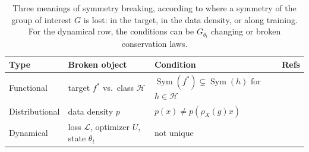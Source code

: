 \documentclass[mathematics,review,submit,moreauthors]{Definitions/mdpi}
\begin{document}
\begin{table}[ht]
    \centering
    \begin{tabularx}{\textwidth}{|l|l|>{\raggedright\arraybackslash}X|>{\raggedright\arraybackslash}X|}
        \hline
        \textbf{Type} & \textbf{Broken object} & \textbf{Condition} & \textbf{Refs} \\
        \hline
        Functional & target $f^*$ vs.\ class $\mathcal{H}$ & $\operatorname{Sym}(f^*)\subsetneq\operatorname{Sym}(h)$ for $h\in \mathcal{H}$ & \citep{wang2023a,zhang2019p3icml,smidt2021prr,lawrence2024,goel2025} \\
        \hline
        Distributional & data density $p$ & $p(x)\neq p(\rho_X(g)x)$ & \citep{lawrence2026,rygiel2026,chen2020,urbano2026} \\
        \hline
        Dynamical & loss $\mathcal{L}$, optimizer $U$, state $\theta_t$ & not unique & \citep{kunin2020,tanaka2021,ziyin2025,arjevani2023} \\
        \hline
    \end{tabularx}
    \caption{Three meanings of symmetry breaking, according to where a symmetry of the group of interest $G$ is lost: in the target, in the data density, or along training.
    For the dynamical row, the conditions can be $G_{\theta_t}$ changing or broken conservation laws.}
    \label{table:symmetry-breaking}
\end{table}
\end{document}
